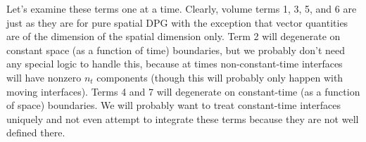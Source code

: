 \documentclass{article}
\begin{document}
Let's examine these terms one at a time. Clearly, volume terms 1, 3, 5, and 6
are just as they are for pure spatial DPG with the exception that vector
quantities are of the dimension of the spatial dimension only. Term 2 will
degenerate on constant space (as a function of time) boundaries, but
we probably don't need any special logic to handle this, because at times
non-constant-time interfaces will have nonzero $n_t$ components (though this
will probably only happen with moving interfaces).
Terms 4 and 7 will degenerate on constant-time (as a function of
space) boundaries. We will probably want to treat constant-time interfaces
uniquely and not even attempt to integrate these terms because they are not
well defined there.

\clearpage
\end{document}
